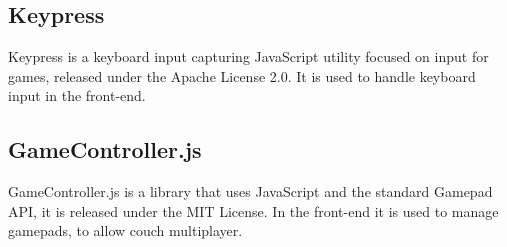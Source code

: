 \subsection{Keypress}
Keypress is a keyboard input capturing JavaScript utility focused on input for games, released under the Apache License 2.0. It is used to handle keyboard input in the front-end\cite{Keypress}.

\subsection{GameController.js}
GameController.js is a library that uses JavaScript and the standard Gamepad API, it is released under the MIT License. In the front-end it is used to manage gamepads, to allow couch multiplayer\cite{gameController_js}.